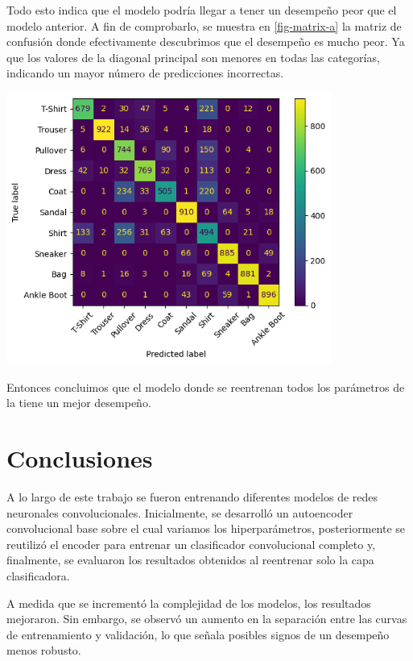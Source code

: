 \documentclass[aps,prl,reprint,groupedaddress]{revtex4-2}
\newenvironment{Figura}
  {\par\medskip\noindent\minipage{\linewidth}}
  {\endminipage\par\medskip}
\begin{document}
Todo esto indica que el modelo podría llegar a tener un desempeño peor que el 
modelo anterior. A fin de comprobarlo, se muestra en \ref{fig-matrix-a} la 
matriz de confusión donde efectivamente descubrimos que el desempeño es mucho 
peor. Ya que los valores de la diagonal principal son menores en todas las 
categorías, indicando un mayor número de predicciones incorrectas.
\begin{Figura}
  \centering
  \includegraphics[width=0.80\textwidth]{figs1/matrix_confucion_modelo_original_entrenando_solo_clasificadora.png}
  \label{fig-matrix-a}
\end{Figura}

Entonces concluimos que el modelo donde se reentrenan todos los parámetros de la
tiene un mejor desempeño.

\section{Conclusiones}

A lo largo de este trabajo se fueron entrenando diferentes modelos de redes
neuronales convolucionales. Inicialmente, se desarrolló un autoencoder
convolucional base sobre el cual variamos los hiperparámetros, posteriormente se 
reutilizó el encoder para entrenar un clasificador convolucional completo y, 
finalmente, se evaluaron los resultados obtenidos al reentrenar solo la capa 
clasificadora.

A medida que se incrementó la complejidad de los modelos, los resultados 
mejoraron. Sin embargo, se observó un aumento en la separación entre las curvas 
de entrenamiento y validación, lo que señala posibles signos de un desempeño 
menos robusto.
\end{document}

